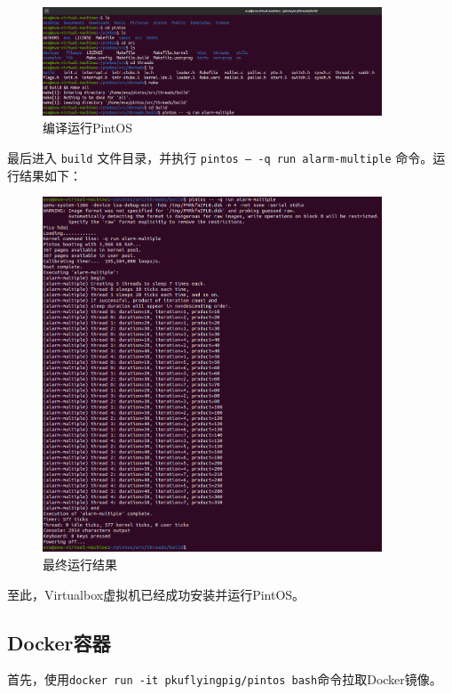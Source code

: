 \documentclass{article}
\begin{document}
\begin{figure}[H]
	\centering
	\includegraphics[width=0.9\textwidth]{img/make_virtualbox.png}
	\caption{编译运行PintOS}
\end{figure}

最后进入 \texttt{build} 文件目录，并执行 \texttt{pintos -- -q run alarm-multiple} 命令。运行结果如下：

\begin{figure}[H]
	\centering
	\includegraphics[width=0.9\textwidth]{img/result_virtualbox.png}
	\caption{最终运行结果}
\end{figure}

至此，Virtualbox虚拟机已经成功安装并运行PintOS。

\subsection{Docker容器}

首先，使用\texttt{docker run -it pkuflyingpig/pintos bash}命令拉取Docker镜像。
\end{document}
